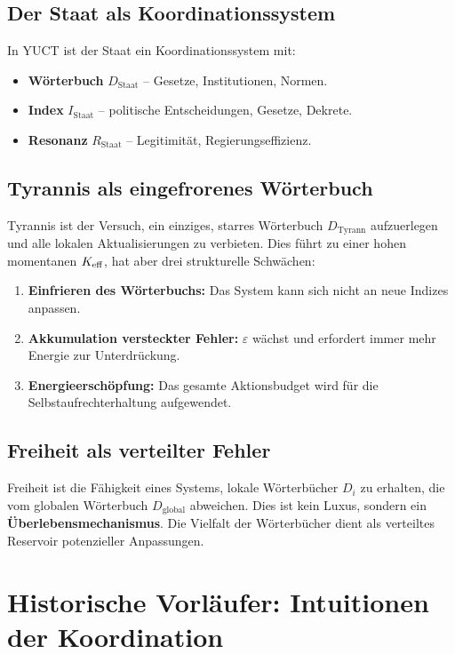 \documentclass[12pt,a4paper]{article}
\newcommand{\eps}{\varepsilon}
\begin{document}
	\subsection{Der Staat als Koordinationssystem}
	
	In YUCT ist der Staat ein Koordinationssystem mit:
	
	\begin{itemize}
		\item \textbf{Wörterbuch} \(D_{\text{Staat}}\) – Gesetze, Institutionen, Normen.
		\item \textbf{Index} \(I_{\text{Staat}}\) – politische Entscheidungen, Gesetze, Dekrete.
		\item \textbf{Resonanz} \(R_{\text{Staat}}\) – Legitimität, Regierungseffizienz.
	\end{itemize}
	
	\subsection{Tyrannis als eingefrorenes Wörterbuch}
	
	Tyrannis ist der Versuch, ein einziges, starres Wörterbuch \(D_{\text{Tyrann}}\) aufzuerlegen und alle lokalen Aktualisierungen zu verbieten. Dies führt zu einer hohen momentanen \(\Keff\), hat aber drei strukturelle Schwächen:
	
	\begin{enumerate}
		\item \textbf{Einfrieren des Wörterbuchs:} Das System kann sich nicht an neue Indizes anpassen.
		\item \textbf{Akkumulation versteckter Fehler:} \(\eps\) wächst und erfordert immer mehr Energie zur Unterdrückung.
		\item \textbf{Energieerschöpfung:} Das gesamte Aktionsbudget wird für die Selbstaufrechterhaltung aufgewendet.
	\end{enumerate}
	
	\subsection{Freiheit als verteilter Fehler}
	
	Freiheit ist die Fähigkeit eines Systems, lokale Wörterbücher \(D_i\) zu erhalten, die vom globalen Wörterbuch \(D_{\text{global}}\) abweichen. Dies ist kein Luxus, sondern ein \textbf{Überlebensmechanismus}. Die Vielfalt der Wörterbücher dient als verteiltes Reservoir potenzieller Anpassungen.
	
	\section{Historische Vorläufer: Intuitionen der Koordination}
	
\end{document}
